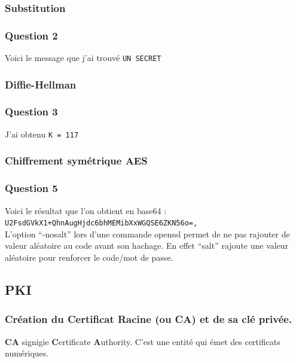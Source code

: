 \documentclass[12pt, a4paper]{article}
\begin{document}
    \subsubsection{Substitution}
    \subsubsection*{Question 2}
    Voici le message que j'ai trouvé \texttt{UN SECRET}

    \subsubsection{Diffie-Hellman}
    \subsubsection*{Question 3}
    J'ai obtenu \texttt{K = 117}

    \subsubsection{Chiffrement symétrique AES}
    \subsubsection*{Question 5}
    Voici le résultat que l'on obtient en base64 : \\

    \texttt{U2FsdGVkX1+QhnAugHjdc6bhMEMibXxWGQSE6ZKN56o=,}\\

    L’option “-nosalt” lors d’une commande openssl permet de ne pas rajouter de valeur aléatoire au code avant son hachage. En effet “salt” rajoute une valeur aléatoire pour renforcer le code/mot de passe.

    \newpage
    \subsection{PKI}   
    \subsubsection{Création du Certificat Racine (ou CA) et de sa clé privée.}
    \textbf{CA} signigie \textbf{C}ertificate \textbf{A}uthority. C'est une entité qui émet des certificats numériques.\\
\end{document}
